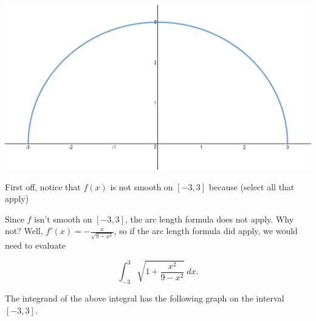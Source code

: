 \documentclass[handout,nooutcomes]{ximera}
\begin{document}
\begin{center} \includegraphics{semicircle.png} \end{center}

\begin{problem}
First off, notice that $f(x)$ is not smooth on $[-3,3]$ because (select all that apply)
\begin{selectAll}
\end{selectAll}
\end{problem}

Since $f$ isn't smooth on $[-3,3]$, the arc length formula does not apply.  Why not?  Well, $f'(x) = -\frac{x}{\sqrt{9-x^2}}$, so if the arc length formula did apply, we would need to evaluate 

$$\displaystyle\int_{-3}^{3} \sqrt{1+\frac{x^2}{9-x^2}} \ dx.$$ 

The integrand of the above integral has the following graph on the interval $[-3,3].$  \\
\end{document}
